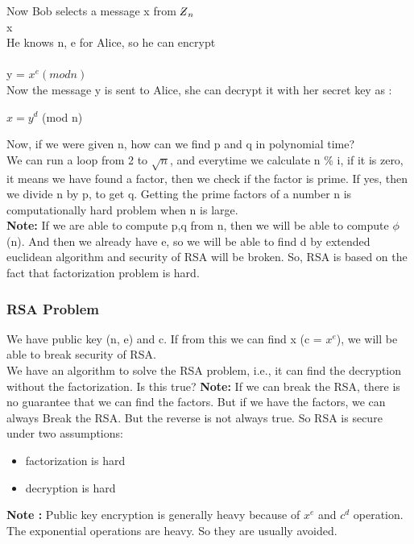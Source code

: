 \documentclass[11pt]{article}
\newcommand{\zbar}{\raisebox{0.2ex}{--}\kern-0.6em Z}
\begin{document}
Now Bob selects a message x from ${\zbar}_n$\\
x\\
He knows n, e for Alice, so he can encrypt\\\\
y = $x^e (mod n)$\\
\vspace{3mm}
Now the message y is sent to Alice, she can decrypt it with her secret key as :
\begin{center}
    $x = y^d$ (mod n)
\end{center}
Now, if we were given n, how can we find p and q in polynomial time?\\
We can run a loop from 2 to $\sqrt{n}$, and everytime we calculate n \% i, if it is zero, it means we have found a factor, then we check if the factor is prime. If yes, then we divide n by p, to get q. Getting the prime factors of a number n is computationally hard problem when n is large.\\
\textbf{Note:} If we are able to compute p,q from n, then we will be able to compute $\phi$(n). And then we already have e, so we will be able to find d by extended euclidean algorithm and security of RSA will be broken. So, RSA is based on the fact that factorization problem is hard.\\
\subsubsection{RSA Problem}
We have public key (n, e) and c. If from this we can find x (c = $x^e$), we will be able to break security of RSA.\\
We have an algorithm to solve the RSA problem, i.e., it can find the decryption without the factorization. Is this true?
\textbf{Note:} If we can break the RSA, there is no guarantee that we can find the factors. But if we have the factors, we can always Break the RSA. But the reverse is not always true. So RSA is secure under two assumptions:
\begin{itemize}
    \item factorization is hard
    \item decryption is hard
\end{itemize}
\textbf{Note : } Public key encryption is generally heavy because of $x^e$ and $c^d$ operation. The exponential operations are heavy. So they are usually avoided.\\
\end{document}
